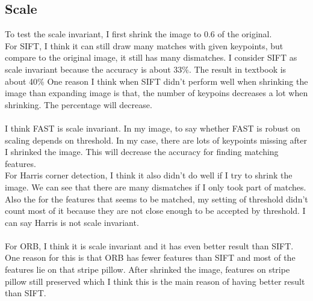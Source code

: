 \documentclass{article}
\begin{document}
\subsection*{Scale}
To test the scale invariant, I first shrink the image to 0.6 of the original.\\
For SIFT, I think it can still draw many matches with given keypoints, but compare to the original image, it still has many dismatches.
I consider SIFT as scale invariant because the accuracy is about 33\%.
The result in textbook is about 40\%
One reason I think when SIFT didn't perform well when shrinking the image than expanding image is that, the number of keypoins decreases a lot when shrinking.
The percentage will decrease.\\
\\
I think FAST is scale invariant.
In my image, to say whether FAST is robust on scaling depends on threshold.
In my case, there are lots of keypoints missing after I shrinked the image.
This will decrease the accuracy for finding matching features.
\\
For Harris corner detection, I think it also didn't do well if I try to shrink the image.
We can see that there are many dismatches if I only took part of matches.
Also the for the features that seems to be matched, my setting of threshold didn't count most of it because they are not close enough
to be accepted by threshold.
I can say Harris is not scale invariant.\\
\\
For ORB, I think it is scale invariant and it has even better result than SIFT.
One reason for this is that ORB has fewer features than SIFT and most of the features lie on that stripe pillow.
After shrinked the image, features on stripe pillow still preserved which I think this is the main reason of having better result than SIFT.
\end{document}

